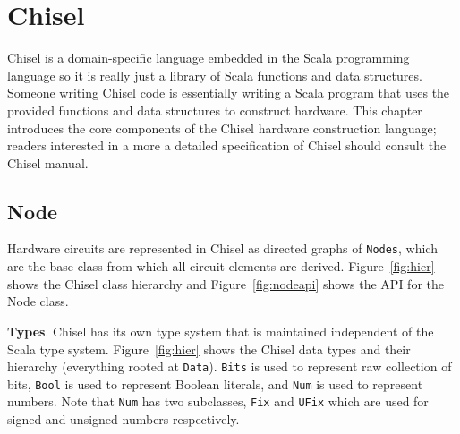 \section{Chisel}
\label{sec:chisel}
Chisel is a domain-specific language embedded in the Scala
programming language so it is really just a library of Scala functions
and data structures. Someone writing Chisel code is essentially writing a Scala
program that uses the provided functions and data structures to
construct hardware. This chapter introduces the core
components of the Chisel hardware construction language; readers
interested in a more a detailed specification of Chisel should consult
the Chisel manual. 

\subsection{Node}
Hardware circuits are represented in Chisel as directed graphs of
{\tt Nodes}, which are the base class from which all circuit elements are
derived. Figure~\ref{fig:hier} shows the Chisel class
hierarchy and Figure~\ref{fig:nodeapi} shows the API for the Node class.

{\bf Types}. Chisel has its own type system that is maintained
independent of the Scala type system. Figure~\ref{fig:hier} shows the
Chisel data types and their hierarchy (everything rooted at
{\tt Data}). {\tt Bits} is used to represent raw collection of bits,
{\tt Bool} is used to represent Boolean literals, and {\tt Num} is
used to represent numbers. Note that {\tt Num} has two subclasses,
{\tt Fix} and {\tt UFix} which are used for signed and unsigned
numbers respectively.

